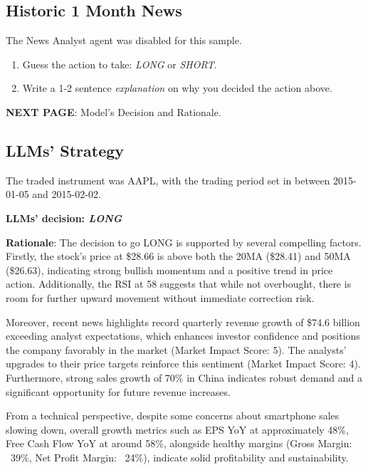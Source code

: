 \documentclass[8pt]{scrartcl}
\begin{document}
\subsection*{Historic 1 Month News}

The News Analyst agent was disabled for this sample.

\begin{tcolorbox}[colback=blue!10, colframe=blue!60, title=\textbf{TASKS}, sharp corners=southwest]
\begin{enumerate}
    \item Guess the action to take: \textit{LONG} or \textit{SHORT}.
    \item Write a 1-2 sentence \textit{explanation} on why you decided the action above.
\end{enumerate}
\end{tcolorbox}

\textbf{NEXT PAGE}: Model's Decision and Rationale.

\newpage

\subsection*{LLMs' Strategy} \label{strategy9}

The traded instrument was AAPL, with the trading period set in between 2015-01-05 and 2015-02-02.

\textbf{LLMs' decision: \textit{LONG}}

\textbf{Rationale}: The decision to go LONG is supported by several compelling factors. Firstly, the stock's price at \$28.66 is above both the 20MA (\$28.41) and 50MA (\$26.63), indicating strong bullish momentum and a positive trend in price action. Additionally, the RSI at 58 suggests that while not overbought, there is room for further upward movement without immediate correction risk.

Moreover, recent news highlights record quarterly revenue growth of \$74.6 billion exceeding analyst expectations, which enhances investor confidence and positions the company favorably in the market (Market Impact Score: 5). The analysts' upgrades to their price targets reinforce this sentiment (Market Impact Score: 4). Furthermore, strong sales growth of 70\% in China indicates robust demand and a significant opportunity for future revenue increases.

From a technical perspective, despite some concerns about smartphone sales slowing down, overall growth metrics such as EPS YoY at approximately 48\%, Free Cash Flow YoY at around 58\%, alongside healthy margins (Gross Margin: ~39\%, Net Profit Margin: ~24\%), indicate solid profitability and sustainability.
\end{document}

